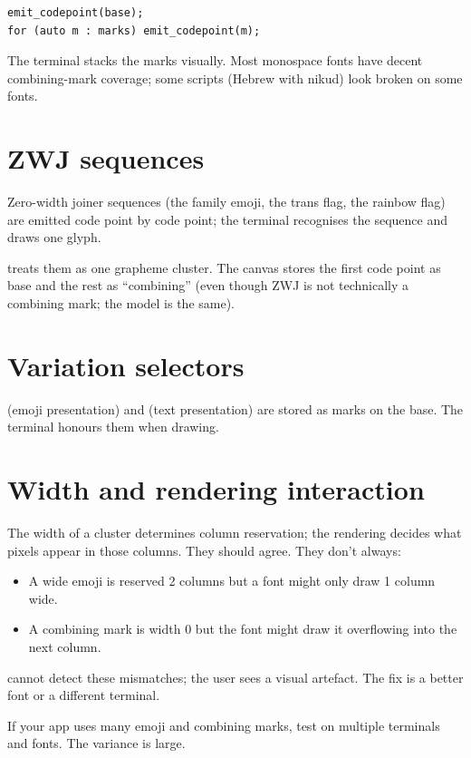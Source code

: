 \begin{lstlisting}
emit_codepoint(base);
for (auto m : marks) emit_codepoint(m);
\end{lstlisting}

The terminal stacks the marks visually. Most monospace fonts
have decent combining-mark coverage; some scripts (Hebrew with
nikud) look broken on some fonts.

\section{ZWJ sequences}

Zero-width joiner sequences (the family emoji, the trans
flag, the rainbow flag) are emitted code point by code point;
the terminal recognises the sequence and draws one glyph.

\maya{} treats them as one grapheme cluster. The canvas
stores the first code point as base and the rest as
``combining'' (even though ZWJ is not technically a
combining mark; the model is the same).

\section{Variation selectors}

 (emoji presentation) and  (text
presentation) are stored as marks on the base. The terminal
honours them when drawing.

\section{Width and rendering interaction}

The width of a cluster determines column reservation; the
rendering decides what pixels appear in those columns. They
should agree. They don't always:

\begin{itemize}[leftmargin=*]
  \item A wide emoji is reserved 2 columns but a font might
    only draw 1 column wide.
  \item A combining mark is width 0 but the font might draw
    it overflowing into the next column.
\end{itemize}

\maya{} cannot detect these mismatches; the user sees a
visual artefact. The fix is a better font or a different
terminal.

\begin{warning}
If your app uses many emoji and combining marks, test on
multiple terminals and fonts. The variance is large.
\end{warning}

